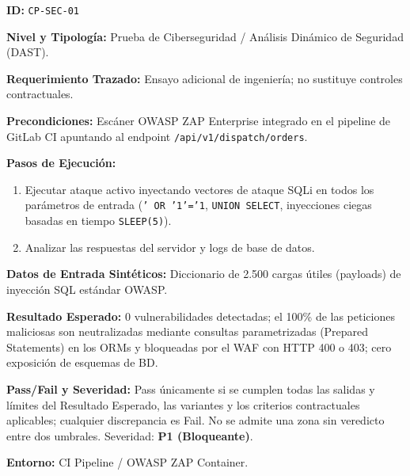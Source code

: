 \par\noindent\textbf{ID:} \texttt{C\allowbreak{}P\allowbreak{}-\allowbreak{}S\allowbreak{}E\allowbreak{}C\allowbreak{}-\allowbreak{}0\allowbreak{}1\allowbreak{}}\par
\par\noindent\textbf{Nivel y Tipología:} Prueba de Ciberseguridad / Análisis Dinámico de Seguridad (DAST).\par
\par\noindent\textbf{Requerimiento Trazado:} Ensayo adicional de ingeniería; no sustituye controles contractuales.\par
\par\noindent\textbf{Precondiciones:} Escáner OWASP ZAP Enterprise integrado en el pipeline de GitLab CI apuntando al endpoint \texttt{/\allowbreak{}a\allowbreak{}p\allowbreak{}i\allowbreak{}/\allowbreak{}v\allowbreak{}1\allowbreak{}/\allowbreak{}d\allowbreak{}i\allowbreak{}s\allowbreak{}p\allowbreak{}a\allowbreak{}t\allowbreak{}c\allowbreak{}h\allowbreak{}/\allowbreak{}o\allowbreak{}r\allowbreak{}d\allowbreak{}e\allowbreak{}r\allowbreak{}s\allowbreak{}}.\par
\par\noindent\textbf{Pasos de Ejecución:} \par
\begin{enumerate}
\item Ejecutar ataque activo inyectando vectores de ataque SQLi en todos los parámetros de entrada (\texttt{'\allowbreak{} O\allowbreak{}R\allowbreak{} '\allowbreak{}1\allowbreak{}'\allowbreak{}=\allowbreak{}'\allowbreak{}1\allowbreak{}}, \texttt{U\allowbreak{}N\allowbreak{}I\allowbreak{}O\allowbreak{}N\allowbreak{} S\allowbreak{}E\allowbreak{}L\allowbreak{}E\allowbreak{}C\allowbreak{}T\allowbreak{}}, inyecciones ciegas basadas en tiempo \texttt{S\allowbreak{}L\allowbreak{}E\allowbreak{}E\allowbreak{}P\allowbreak{}(\allowbreak{}5\allowbreak{})\allowbreak{}}).
\item Analizar las respuestas del servidor y logs de base de datos.
\end{enumerate}
\par\noindent\textbf{Datos de Entrada Sintéticos:} Diccionario de 2.500 cargas útiles (payloads) de inyección SQL estándar OWASP.\par
\par\noindent\textbf{Resultado Esperado:} 0 vulnerabilidades detectadas; el 100\% de las peticiones maliciosas son neutralizadas mediante consultas parametrizadas (Prepared Statements) en los ORMs y bloqueadas por el WAF con HTTP 400 o 403; cero exposición de esquemas de BD.\par
\par\noindent\textbf{Pass/Fail y Severidad:} Pass únicamente si se cumplen todas las salidas y límites del Resultado Esperado, las variantes y los criterios contractuales aplicables; cualquier discrepancia es Fail. No se admite una zona sin veredicto entre dos umbrales. Severidad: \textbf{P1 (Bloqueante)}.\par
\par\noindent\textbf{Entorno:} CI Pipeline / OWASP ZAP Container.\par






